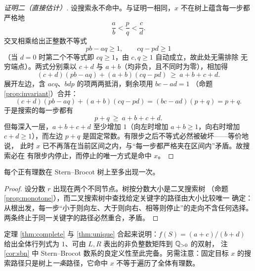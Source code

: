 \begin{proof}[证明二（直接估计）]
设搜索永不命中。与证明一相同，$x$ 不在树上蕴含每一步都严格地
\[
  \frac ab<\frac pq<\frac cd.
\]
交叉相乘给出正整数不等式
\[
  pb-aq\ge1,\qquad cq-pd\ge1
\]
（当 $d=0$ 时第二个不等式即 $cq\ge1$，由 $c,q\ge1$ 自动成立，故此处无需排除
无穷端点）。两式分别乘以 $c+d$ 与 $a+b$（均非负，且不同时为零），相加得
\[
  (c+d)(pb-aq)+(a+b)(cq-pd)\ \ge\ a+b+c+d.
\]
展开左边，含 $acq$、$bdp$ 的项两两抵消，剩余项用 $bc-ad=1$
（命题 \ref{prop:invariant}）合并：
\[
  (c+d)(pb-aq)+(a+b)(cq-pd)
  =(bc-ad)(p+q)=p+q.
\]
于是搜索的每一步都有
\[
  p+q\ \ge\ a+b+c+d.
\]
但每深入一层，$a+b+c+d$ 至少增加 $1$（向左时增加 $a+b\ge1$，向右时增加
$c+d\ge1$），而左边 $p+q$ 是固定常数。有限步之后不等式必然被破坏——等价地说，
此时 $x$ 已不再落在当前区间之内，与``每一步都严格夹在区间内''矛盾。故搜索必在
有限步内停止，而停止的唯一方式是命中 $x$。
\end{proof}

\begin{theorem}[唯一性]\label{thm:unique}
每个正有理数在 Stern--Brocot 树上至多出现一次。
\end{theorem}

\begin{proof}
设分数 $r$ 出现在两个不同节点。树按分数大小是二叉搜索树
（命题 \ref{prop:monotone}），而二叉搜索树中查找给定关键字的路径由大小比较唯一
确定：从根出发，每一步``小于则向左、大于则向右、相等则停止''的走向不含任何选择。
两条终止于同一关键字的路径必然重合，矛盾。
\end{proof}

\begin{remark}
定理 \ref{thm:complete} 与 \ref{thm:unique} 合起来说明：$f(S)=(a+c)/(b+d)$
给出全体行列式为 $1$、可由 $L,R$ 表出的非负整数矩阵到 $\mathbb{Q}_{>0}$ 的双射，
注 \ref{cor:sbn} 中 Stern--Brocot 数系的良定义性至此完备。另需注意：固定目标
$x$ 的搜索路径只是树上\emph{一条}路径，它命中 $x$ 不等于遍历了全体有理数。
\end{remark}

